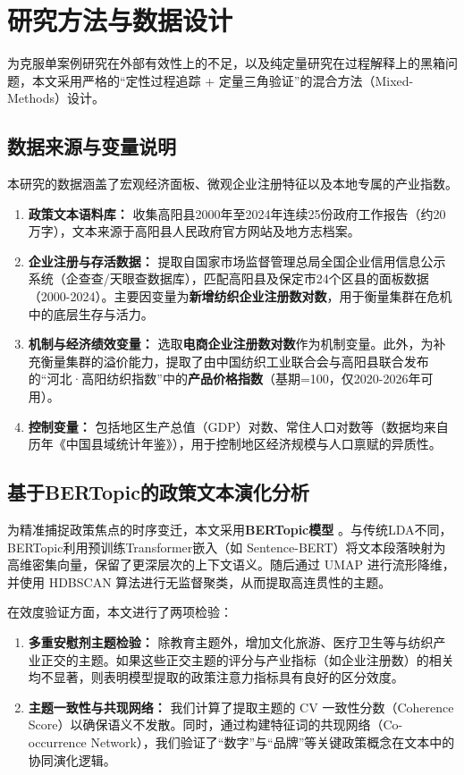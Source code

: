 \documentclass[12pt,a4paper]{ctexart}
\begin{document}
\section{研究方法与数据设计}
\label{sec:method}

为克服单案例研究在外部有效性上的不足，以及纯定量研究在过程解释上的黑箱问题，本文采用严格的\textquotedblleft 定性过程追踪 + 定量三角验证\textquotedblright 的混合方法（Mixed-Methods）设计。

\subsection{数据来源与变量说明}
本研究的数据涵盖了宏观经济面板、微观企业注册特征以及本地专属的产业指数。
\begin{enumerate}
    \item \textbf{政策文本语料库：} 收集高阳县2000年至2024年连续25份政府工作报告（约20万字），文本来源于高阳县人民政府官方网站及地方志档案。
    \item \textbf{企业注册与存活数据：} 提取自国家市场监督管理总局全国企业信用信息公示系统（企查查/天眼查数据库），匹配高阳县及保定市24个区县的面板数据（2000-2024）。主要因变量为\textbf{新增纺织企业注册数对数}，用于衡量集群在危机中的底层生存与活力。
    \item \textbf{机制与经济绩效变量：} 选取\textbf{电商企业注册数对数}作为机制变量。此外，为补充衡量集群的溢价能力，提取了由中国纺织工业联合会与高阳县联合发布的\textquotedblleft 河北·高阳纺织指数\textquotedblright 中的\textbf{产品价格指数}（基期=100，仅2020-2026年可用）。
    \item \textbf{控制变量：} 包括地区生产总值（GDP）对数、常住人口对数等（数据均来自历年《中国县域统计年鉴》），用于控制地区经济规模与人口禀赋的异质性。
\end{enumerate}

\subsection{基于BERTopic的政策文本演化分析}
为精准捕捉政策焦点的时序变迁，本文采用\textbf{BERTopic模型} \cite{Grootendorst2022}。与传统LDA不同，BERTopic利用预训练Transformer嵌入（如 Sentence-BERT）将文本段落映射为高维密集向量，保留了更深层次的上下文语义。随后通过 UMAP 进行流形降维，并使用 HDBSCAN 算法进行无监督聚类，从而提取高连贯性的主题。

在效度验证方面，本文进行了两项检验：
\begin{enumerate}
    \item \textbf{多重安慰剂主题检验：} 除教育主题外，增加文化旅游、医疗卫生等与纺织产业正交的主题。如果这些正交主题的评分与产业指标（如企业注册数）的相关均不显著，则表明模型提取的政策注意力指标具有良好的区分效度。
    \item \textbf{主题一致性与共现网络：} 我们计算了提取主题的 CV 一致性分数（Coherence Score）以确保语义不发散。同时，通过构建特征词的共现网络（Co-occurrence Network），我们验证了“数字”与“品牌”等关键政策概念在文本中的协同演化逻辑。
\end{enumerate}
\end{document}
